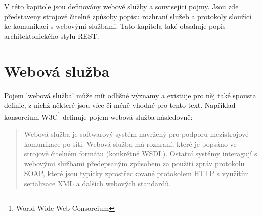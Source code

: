 \documentclass[czech,DP]{thesiskiv}
\begin{document}
V této kapitole jsou definovány webové služby a související pojmy. Jsou zde představeny strojově čitelné způsoby popisu rozhraní služeb a protokoly sloužící ke komunikaci s webovými službami. Tato kapitola také obsahuje popis architektonického stylu REST. 

%

\section{Webová služba}




Pojem 'webová služba' může mít odlišné významy\cite{w3cWsDesignIssues} a existuje pro něj také spousta definic, z nichž některé jsou více či méně vhodné pro tento text. Například konsorcium W3C\footnote{World Wide Web Consorcium} definuje pojem webová služba následovně\cite{w3cWsArch}:


\begin{quote}
	Webová služba je softwarový systém navržený pro podporu mezistrojové komunikace po síti. Webová služba má rozhraní, které je popsáno ve strojově čitelném formátu (konkrétně WSDL). Ostatní systémy interagují s webovými službami předepsaným způsobem za použití zpráv protokolu SOAP, které jsou typicky zprostředkované protokolem HTTP s využitím serializace XML a dalších webových standardů.
\end{quote}
\end{document}
